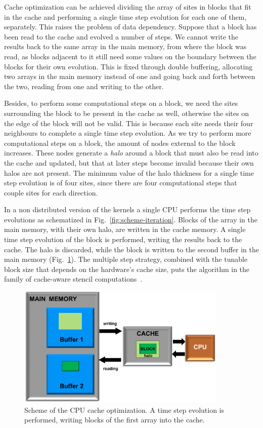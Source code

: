 Cache optimization can be achieved dividing the array of sites in blocks that fit in the cache and performing a single time step evolution for each one of them, separately. This raises the problem of data dependency. Suppose that a block has been read to the cache and evolved a number of steps. We cannot write the results back to the same array in the main memory, from where the block was read, as blocks adjacent to it still need some values on the boundary between the blocks for their own evolution. This is fixed through double buffering, allocating two arrays in the main memory instead of one and going back and forth between the two, reading from one and writing to the other.

Besides, to perform some computational steps on a block, we need the sites surrounding the block to be present in the cache as well, otherwise the sites on the edge of the block will not be valid. This is because each site needs their four neighbours to complete a single time step evolution. As we try to perform more computational steps on a block, the amount of nodes external to the block increases. These nodes generate a \textit{halo} around a block that must also be read into the cache and updated, but that at later steps become invalid because their own halos are not present. The minimum value of the halo thickness for a single time step evolution is of four sites, since there are four computational steps that couple sites for each direction.

In a non distributed version of the kernels a single CPU performs the time step evolutions as schematized in Fig.~\ref{fig:scheme-iteration}. Blocks of the array in the main memory, with their own halo, are written in the cache memory. A single time step evolution of the block is performed, writing the results back to the cache. The halo is discarded, while the block is written to the second buffer in the main memory (Fig.~\ref{fig:CPU-cache-optimization}). The multiple step strategy, combined with the tunable block size that depends on the hardware's cache size, puts the algorithm in the family of cache-aware stencil computations~\cite{kamil2006implicit}.
\begin{figure}
   \centering
   \includegraphics[width=10cm]{Figs/CPU-cache_optimization.png}
   \caption{Scheme of the CPU cache optimization. A time step evolution is performed, writing blocks of the first array into the cache.} \label{fig:CPU-cache-optimization}
\end{figure}

